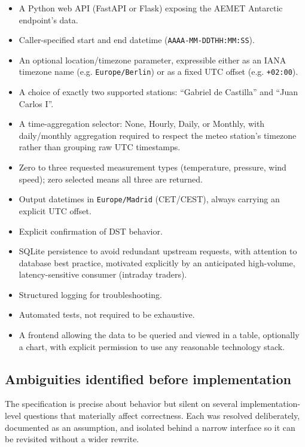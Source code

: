 \documentclass[11pt,a4paper]{article}
\begin{document}
\begin{itemize}[nosep]
    \item A Python web API (FastAPI or Flask) exposing the AEMET Antarctic
    endpoint's data.
    \item Caller-specified start and end datetime
    (\texttt{AAAA-MM-DDTHH:MM:SS}).
    \item An optional location/timezone parameter, expressible either as
    an IANA timezone name (e.g. \texttt{Europe/Berlin}) or as a fixed UTC
    offset (e.g. \texttt{+02:00}).
    \item A choice of exactly two supported stations: ``Gabriel de
    Castilla'' and ``Juan Carlos I''.
    \item A time-aggregation selector: None, Hourly, Daily, or Monthly,
    with daily/monthly aggregation required to respect the meteo
    station's timezone rather than grouping raw UTC timestamps.
    \item Zero to three requested measurement types (temperature,
    pressure, wind speed); zero selected means all three are returned.
    \item Output datetimes in \texttt{Europe/Madrid} (CET/CEST), always
    carrying an explicit UTC offset.
    \item Explicit confirmation of DST behavior.
    \item SQLite persistence to avoid redundant upstream requests, with
    attention to database best practice, motivated explicitly by an
    anticipated high-volume, latency-sensitive consumer (intraday
    traders).
    \item Structured logging for troubleshooting.
    \item Automated tests, not required to be exhaustive.
    \item A frontend allowing the data to be queried and viewed in a
    table, optionally a chart, with explicit permission to use any
    reasonable technology stack.

\end{itemize}

\subsection{Ambiguities identified before implementation}

The specification is precise about behavior but silent on several
implementation-level questions that materially affect correctness. Each was
resolved deliberately, documented as an assumption, and isolated behind a
narrow interface so it can be revisited without a wider rewrite.
\end{document}
